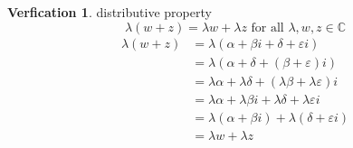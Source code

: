 \documentclass[11pt]{article}
\theoremstyle{definition}
\newtheorem{ver}{Verfication}[section]
\begin{document}
\begin{ver}
    distributive property
    \begin{equation*}
        \lambda\left(w + z\right) = \lambda w + \lambda z \text{ for all  } \lambda, w, z \in \mathbb{C}    
    \end{equation*}
    \begin{align*}
        \lambda\left( w + z \right) &= \lambda \left( \alpha + \beta i + \delta + \varepsilon i \right) \\
                                    &= \lambda\left(\alpha + \delta + \left( \beta + \varepsilon \right)i\right) \\
                                    &= \lambda \alpha + \lambda \delta + \left( \lambda \beta + \lambda\varepsilon \right)i \\
                                    &= \lambda \alpha + \lambda \beta i + \lambda \delta + \lambda \varepsilon i \\
                                    &= \lambda \left( \alpha + \beta i \right) + \lambda \left( \delta + \varepsilon i \right) \\
                                    &= \lambda w + \lambda z
    \end{align*}
\end{ver}



\end{document}
